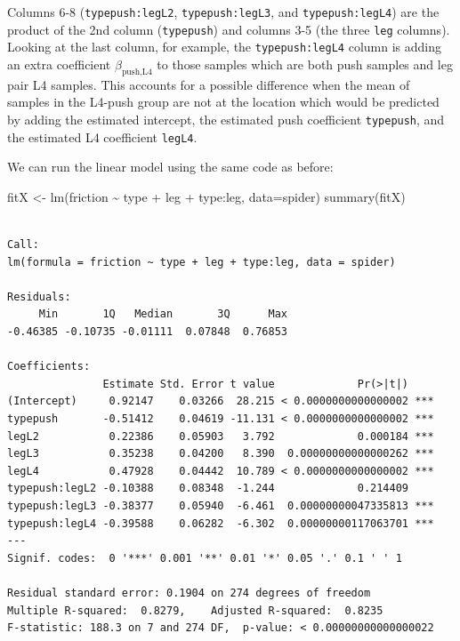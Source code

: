 \documentclass[
  letterpaper,
  DIV=11,
  numbers=noendperiod]{scrartcl}
\newenvironment{Shaded}{\begin{snugshade}}{\end{snugshade}}
\newcommand{\AttributeTok}[1]{\textcolor[rgb]{0.40,0.45,0.13}{#1}}
\newcommand{\FunctionTok}[1]{\textcolor[rgb]{0.28,0.35,0.67}{#1}}
\newcommand{\NormalTok}[1]{\textcolor[rgb]{0.00,0.23,0.31}{#1}}
\newcommand{\OtherTok}[1]{\textcolor[rgb]{0.00,0.23,0.31}{#1}}
\newcommand{\SpecialCharTok}[1]{\textcolor[rgb]{0.37,0.37,0.37}{#1}}
\begin{document}
Columns 6-8 (\texttt{typepush:legL2}, \texttt{typepush:legL3}, and
\texttt{typepush:legL4}) are the product of the 2nd column
(\texttt{typepush}) and columns 3-5 (the three \texttt{leg} columns).
Looking at the last column, for example, the \texttt{typepush:legL4}
column is adding an extra coefficient \(\beta_{\textrm{push,L4}}\) to
those samples which are both push samples and leg pair L4 samples. This
accounts for a possible difference when the mean of samples in the
L4-push group are not at the location which would be predicted by adding
the estimated intercept, the estimated push coefficient
\texttt{typepush}, and the estimated L4 coefficient \texttt{legL4}.

We can run the linear model using the same code as before:

\begin{Shaded}
\begin{Highlighting}[]
\NormalTok{fitX }\OtherTok{\textless{}{-}} \FunctionTok{lm}\NormalTok{(friction }\SpecialCharTok{\textasciitilde{}}\NormalTok{ type }\SpecialCharTok{+}\NormalTok{ leg }\SpecialCharTok{+}\NormalTok{ type}\SpecialCharTok{:}\NormalTok{leg, }\AttributeTok{data=}\NormalTok{spider)}
\FunctionTok{summary}\NormalTok{(fitX)}
\end{Highlighting}
\end{Shaded}

\begin{verbatim}

Call:
lm(formula = friction ~ type + leg + type:leg, data = spider)

Residuals:
     Min       1Q   Median       3Q      Max 
-0.46385 -0.10735 -0.01111  0.07848  0.76853 

Coefficients:
               Estimate Std. Error t value             Pr(>|t|)    
(Intercept)     0.92147    0.03266  28.215 < 0.0000000000000002 ***
typepush       -0.51412    0.04619 -11.131 < 0.0000000000000002 ***
legL2           0.22386    0.05903   3.792             0.000184 ***
legL3           0.35238    0.04200   8.390  0.00000000000000262 ***
legL4           0.47928    0.04442  10.789 < 0.0000000000000002 ***
typepush:legL2 -0.10388    0.08348  -1.244             0.214409    
typepush:legL3 -0.38377    0.05940  -6.461  0.00000000047335813 ***
typepush:legL4 -0.39588    0.06282  -6.302  0.00000000117063701 ***
---
Signif. codes:  0 '***' 0.001 '**' 0.01 '*' 0.05 '.' 0.1 ' ' 1

Residual standard error: 0.1904 on 274 degrees of freedom
Multiple R-squared:  0.8279,    Adjusted R-squared:  0.8235 
F-statistic: 188.3 on 7 and 274 DF,  p-value: < 0.00000000000000022
\end{verbatim}
\end{document}
